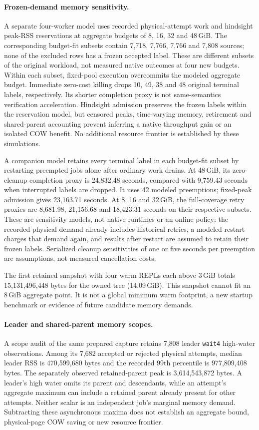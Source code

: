 \documentclass[10pt,twocolumn]{article}
\begin{document}
\paragraph{Frozen-demand memory sensitivity.}
A separate four-worker model uses recorded physical-attempt work and
hindsight peak-RSS reservations at aggregate budgets of 8, 16, 32 and
48\,GiB. The corresponding budget-fit subsets contain 7,718, 7,766, 7,766
and 7,808 sources; none of the excluded rows has a frozen accepted label.
These are different subsets of the original workload, not measured native
outcomes at four new budgets. Within each subset, fixed-pool execution
overcommits the modeled aggregate budget. Immediate zero-cost killing drops
10, 49, 38 and 48 original terminal labels, respectively. Its shorter
completion proxy is not same-semantics verification acceleration.
Hindsight admission preserves the frozen labels within the reservation model,
but censored peaks, time-varying memory, retirement and shared-parent
accounting prevent inferring a native throughput gain or an isolated COW
benefit. No additional resource frontier is established by these simulations.

A companion model retains every terminal label in each budget-fit subset by
restarting preempted jobs alone after ordinary work drains. At 48\,GiB,
its zero-cleanup completion proxy is 24,832.48 seconds, compared with
9,759.43 seconds when interrupted labels are dropped. It uses 42 modeled
preemptions; fixed-peak admission gives 23,163.71 seconds. At 8, 16 and
32\,GiB, the full-coverage retry proxies are 8,681.98, 21,156.68 and
18,423.31 seconds on their respective subsets. These are sensitivity models,
not native runtimes or an online policy: the recorded physical demand already
includes historical retries, a modeled restart charges that demand again,
and results after restart are assumed to retain their frozen labels.
Serialized cleanup sensitivities of one or five seconds per preemption are
assumptions, not measured cancellation costs.

The first retained snapshot with four warm REPLs each above 3\,GiB totals
15,131,496,448 bytes for the owned tree (14.09\,GiB). This snapshot cannot fit
an 8\,GiB aggregate point. It is not a global minimum warm footprint, a
new startup benchmark or evidence of future candidate memory demands.

\paragraph{Leader and shared-parent memory scopes.}
A scope audit of the same prepared capture retains 7,808 leader
\texttt{wait4} high-water observations. Among its 7,682 accepted or rejected
physical attempts, median leader RSS is 470,599,680 bytes and the recorded
99th percentile is 977,809,408 bytes. The separately observed retained-parent
peak is 3,614,543,872 bytes. A leader's high water omits its parent and
descendants, while an attempt's aggregate maximum can include a retained
parent already present for other attempts. Neither scalar is an independent
job's marginal memory demand. Subtracting these asynchronous maxima does not
establish an aggregate bound, physical-page COW saving or new resource frontier.
\end{document}
